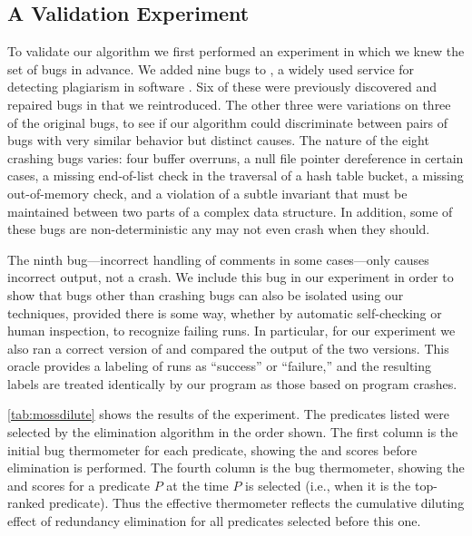 \subsection{A Validation Experiment}

To validate our algorithm we first performed an experiment in which we
knew the set of bugs in advance.  We added nine bugs to \moss, a
widely used service for detecting plagiarism in software
\cite{Schleimer:2003:WLA}.  Six of these were previously discovered
and repaired bugs in \moss that we reintroduced.  The other three were
variations on three of the original bugs, to see if our algorithm could
discriminate between pairs of bugs with very similar behavior but
distinct causes.  The nature of the eight crashing bugs varies: four
buffer overruns, a null file pointer dereference in certain cases, a
missing end-of-list check in the traversal of a hash table bucket, a missing
out-of-memory check, and a violation of a subtle invariant that must be maintained between two
parts of a complex data structure.  In addition, some of these bugs
are non-deterministic any may not even crash when they should.

The ninth bug---incorrect handling of comments in some cases---only
causes incorrect output, not a crash.  We include this bug in our
experiment in order to show that bugs other than crashing bugs can 
also be isolated using our techniques, provided there is some 
way, whether by automatic self-checking or human inspection, to recognize
failing runs.  In particular, for our experiment we also ran a correct 
version of \moss{} and compared the output of the two versions. 
This oracle provides a labeling of runs as ``success'' or ``failure,'' 
and the resulting labels are treated identically by our program as
those based on program crashes.



\autoref{tab:mossdilute} shows the results of the experiment.  The
predicates listed were selected by the elimination algorithm in the
order shown.  The first column is the initial bug thermometer for each
predicate, showing the \context{} and \increase{} scores before
elimination is performed. The fourth column is the 
bug thermometer, showing the \context{} and \increase{} scores for a
predicate $P$ at the time $P$ is selected (i.e., when it is the
top-ranked predicate).  Thus the effective thermometer reflects the
cumulative diluting effect of redundancy elimination for all
predicates selected before this one.

